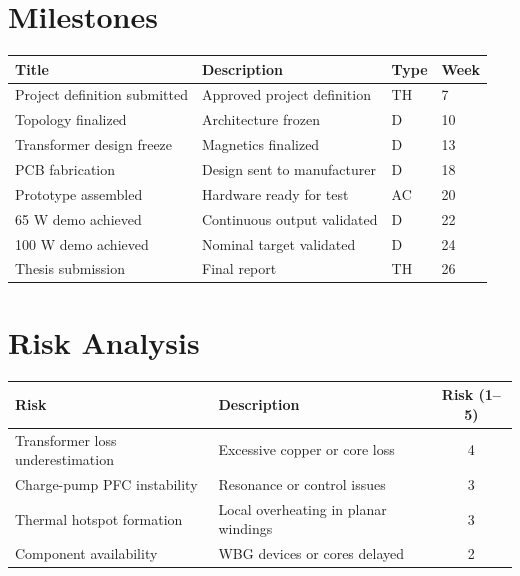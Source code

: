 \documentclass[12pt,a4paper]{report}
\begin{document}
\section{Milestones}

\begin{table}[h]
\centering
\begin{tabular}{llll}
\toprule
Title & Description & Type & Week \\
\midrule
Project definition submitted & Approved project definition & TH & 7 \\
Topology finalized & Architecture frozen & D & 10 \\
Transformer design freeze & Magnetics finalized & D & 13 \\
PCB fabrication & Design sent to manufacturer & D & 18 \\
Prototype assembled & Hardware ready for test & AC & 20 \\
65 W demo achieved & Continuous output validated & D & 22 \\
100 W demo achieved & Nominal target validated & D & 24 \\
Thesis submission & Final report & TH & 26 \\
\bottomrule
\end{tabular}
\end{table}

\section{Risk Analysis}

\begin{table}[h]
\centering
\begin{tabular}{p{3cm} p{7cm} c}
\toprule
Risk & Description & Risk (1--5) \\
\midrule
Transformer loss underestimation & Excessive copper or core loss & 4 \\
Charge-pump PFC instability & Resonance or control issues & 3 \\
Thermal hotspot formation & Local overheating in planar windings & 3 \\
Component availability & WBG devices or cores delayed & 2 \\
\bottomrule
\end{tabular}
\end{table}
\end{document}
